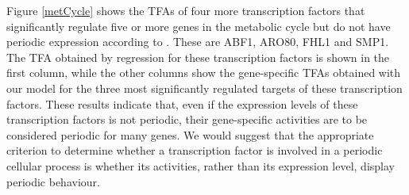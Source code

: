 \documentclass[english]{sheftech}
\begin{document}
Figure \ref{metCycle} shows the TFAs of four more transcription factors that
significantly regulate five or more genes in the metabolic cycle but do not 
have periodic expression according to \cite{Tu05}. These are ABF1, ARO80, FHL1 
and SMP1. The TFA obtained by regression for these transcription factors is 
shown in the first column, while the other columns show the gene-specific
TFAs obtained with our model for the three most significantly regulated
targets of these transcription factors. These results indicate that, even if
the expression levels of these transcription factors is not periodic, their
gene-specific activities are to be considered periodic for many genes. 
We would suggest that the appropriate criterion to determine whether a 
transcription factor is involved in a periodic cellular process is whether its 
activities, rather than its expression level, display periodic behaviour.
\end{document}
